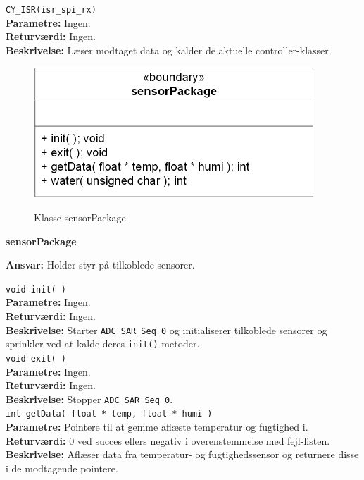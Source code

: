 \verb+CY_ISR(isr_spi_rx) +\\
\textbf{Parametre:} Ingen. \\
\textbf{Returværdi:} Ingen. \\
\textbf{Beskrivelse:} Læser modtaget data og kalder de aktuelle controller-klasser. \\

\begin{figure}[htbp] \centering
{\includegraphics[scale=1.3]{filer/design/Klassediagrammer/sw_psoc_sensorPackage}}
\caption{Klasse sensorPackage}
\label{fig:sw_psoc_class_sensorPackage}
\end{figure} 

{\centering
\textbf{sensorPackage}\par
}
\textbf{Ansvar:} Holder styr på tilkoblede sensorer. \

\verb+void init( ) +\\
\textbf{Parametre:} Ingen. \\
\textbf{Returværdi:} Ingen. \\
\textbf{Beskrivelse:} Starter \verb+ADC_SAR_Seq_0+ og initialiserer tilkoblede sensorer og sprinkler ved at kalde deres \verb+init()+-metoder. \\

\verb+void exit( ) +\\
\textbf{Parametre:} Ingen. \\
\textbf{Returværdi:} Ingen. \\
\textbf{Beskrivelse:} Stopper \verb+ADC_SAR_Seq_0+. \\

\verb+int getData( float * temp, float * humi )+ \\
\textbf{Parametre:} Pointere til at gemme aflæste temperatur og fugtighed i. \\
\textbf{Returværdi:} 0 ved succes ellers negativ i overenstemmelse med fejl-listen. \\
\textbf{Beskrivelse:} Aflæser data fra temperatur- og fugtighedssensor og returnere disse i de modtagende pointere. \\

